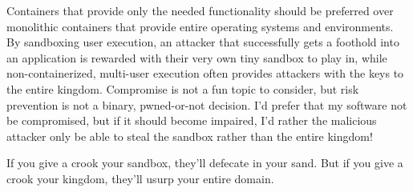 Containers that provide only the needed functionality should be preferred over monolithic containers that provide entire operating systems and environments. By sandboxing user execution, an attacker that successfully gets a foothold into an application is rewarded with their very own tiny sandbox to play in, while non-containerized, multi-user execution often provides attackers with the keys to the entire kingdom. Compromise is not a fun topic to consider, but risk prevention is not a binary, pwned-or-not decision. I'd prefer that my software not be compromised, but if it should become impaired, I'd rather the malicious attacker only be able to steal the sandbox rather than the entire kingdom!

If you give a crook your sandbox, they'll defecate in your sand. But if you give a crook your kingdom, they'll usurp your entire domain.

